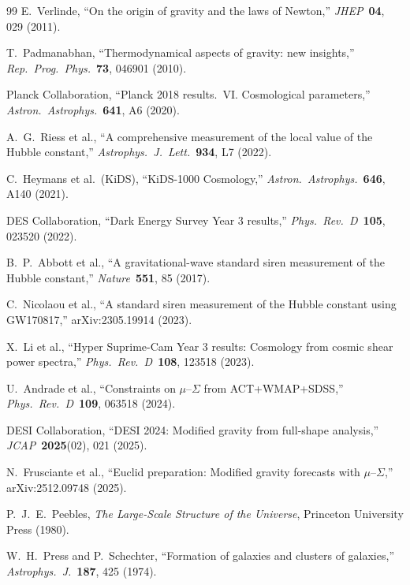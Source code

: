 \documentclass[twocolumn,a4paper,aps,prd,twocolumn,showpacs,notitlepage,superscriptaddress,nofootinbib]{article}
\begin{document}
\begin{thebibliography}{99}
E.~Verlinde,
``On the origin of gravity and the laws of Newton,''
\textit{JHEP}\ \textbf{04}, 029 (2011).

T.~Padmanabhan,
``Thermodynamical aspects of gravity: new insights,''
\textit{Rep.\ Prog.\ Phys.}\ \textbf{73}, 046901 (2010).

Planck Collaboration,
``Planck 2018 results.\ VI. Cosmological parameters,''
\textit{Astron.\ Astrophys.}\ \textbf{641}, A6 (2020).

A.~G.~Riess et al.,
``A comprehensive measurement of the local value of the Hubble constant,''
\textit{Astrophys.\ J.\ Lett.}\ \textbf{934}, L7 (2022).

C.~Heymans et al.\ (KiDS),
``KiDS-1000 Cosmology,''
\textit{Astron.\ Astrophys.}\ \textbf{646}, A140 (2021).

DES Collaboration,
``Dark Energy Survey Year 3 results,''
\textit{Phys.\ Rev.\ D}\ \textbf{105}, 023520 (2022).

B.~P.~Abbott et al.,
``A gravitational-wave standard siren measurement of the Hubble constant,''
\textit{Nature}\ \textbf{551}, 85 (2017).

C.~Nicolaou et al.,
``A standard siren measurement of the Hubble constant using GW170817,''
arXiv:2305.19914 (2023).

X.~Li et al.,
``Hyper Suprime-Cam Year 3 results: Cosmology from cosmic shear power spectra,''
\textit{Phys.\ Rev.\ D}\ \textbf{108}, 123518 (2023).

U.~Andrade et al.,
``Constraints on $\mu$--$\Sigma$ from ACT+WMAP+SDSS,''
\textit{Phys.\ Rev.\ D}\ \textbf{109}, 063518 (2024).

DESI Collaboration,
``DESI 2024: Modified gravity from full-shape analysis,''
\textit{JCAP}\ \textbf{2025}(02), 021 (2025).

N.~Frusciante et al.,
``Euclid preparation: Modified gravity forecasts with $\mu$--$\Sigma$,''
arXiv:2512.09748 (2025).

P.~J.~E.~Peebles,
\textit{The Large-Scale Structure of the Universe},
Princeton University Press (1980).

W.~H.~Press and P.~Schechter,
``Formation of galaxies and clusters of galaxies,''
\textit{Astrophys.\ J.}\ \textbf{187}, 425 (1974).


\end{thebibliography}
\end{document}
